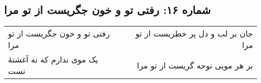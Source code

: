 \begin{center}
\section*{شماره ۱۶: رفتی تو و خون جگریست از تو مرا}
\label{sec:016}
\begin{longtable}{l p{0.5cm} r}
رفتی تو و خون جگریست از تو مرا
&&
جان بر لب و دل پر خطریست از تو مرا
\\
یک موی ندارم که نه آغشتهٔ تست
&&
بر هر مویی نوحه گریست از تو مرا
\\
\end{longtable}
\end{center}
